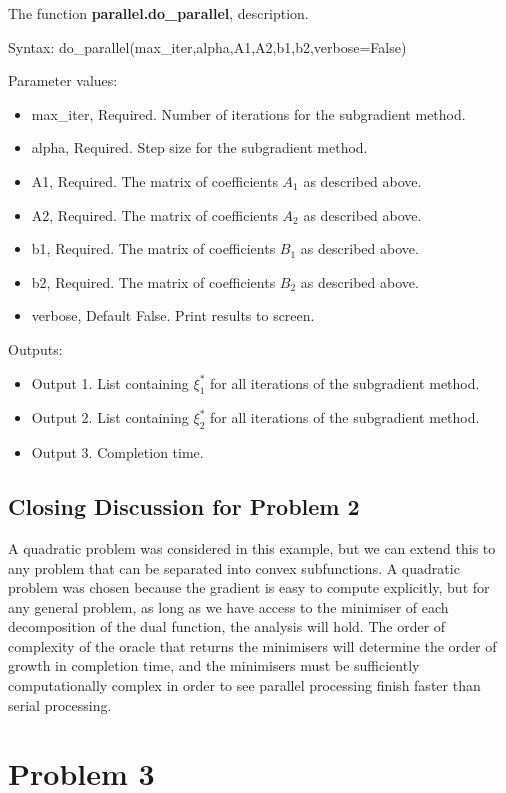 \documentclass[12pt]{article}
\begin{document}
\noindent The function \textbf{parallel.do\_parallel}, description.

Syntax: do\_parallel(max\_iter,alpha,A1,A2,b1,b2,verbose=False)

Parameter values:
\begin{itemize}
	\item max\_iter, Required. Number of iterations for the subgradient method.
	\item alpha, Required. Step size for the subgradient method.
	\item A1, Required. The matrix of coefficients $A_1$ as described above.
	\item A2, Required. The matrix of coefficients $A_2$ as described above.
	\item b1, Required. The matrix of coefficients $B_1$ as described above.
	\item b2, Required. The matrix of coefficients $B_2$ as described above.
	\item verbose, Default False. Print results to screen.
\end{itemize}

Outputs:
\begin{itemize}
	\item Output 1. List containing $\xi_1^*$ for all iterations of the subgradient method.
	\item Output 2. List containing $\xi_2^*$ for all iterations of the subgradient method.
	\item Output 3. Completion time.
\end{itemize}

\subsection*{Closing Discussion for Problem 2}

A quadratic problem was considered in this example, but we can extend this to any problem that can be separated into convex subfunctions. A quadratic problem was chosen because the gradient is easy to compute explicitly, but for any general problem, as long as we have access to the minimiser of each decomposition of the dual function, the analysis will hold. The order of complexity of the oracle that returns the minimisers will determine the order of growth in completion time, and the minimisers must be sufficiently computationally complex in order to see parallel processing finish faster than serial processing.

\section*{Problem 3}
\end{document}
